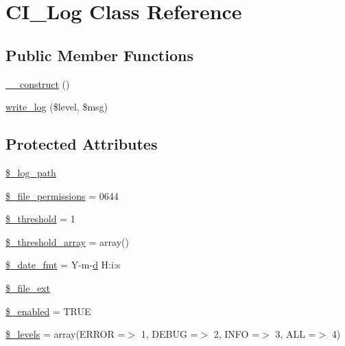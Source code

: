 \hypertarget{class_c_i___log}{}\section{C\+I\+\_\+\+Log Class Reference}
\label{class_c_i___log}
\subsection*{Public Member Functions}
\begin{DoxyCompactItemize}
\item 
\hyperlink{class_c_i___log_a095c5d389db211932136b53f25f39685}{\+\_\+\+\_\+construct} ()
\item 
\hyperlink{class_c_i___log_ae63dcdf6d5a7f494d7e401e3fc6da2b4}{write\+\_\+log} (\$level, \$msg)
\end{DoxyCompactItemize}
\subsection*{Protected Attributes}
\begin{DoxyCompactItemize}
\item 
\hyperlink{class_c_i___log_a3eaf9e92941ee6be33bc972ab76b4caf}{\$\+\_\+log\+\_\+path}
\item 
\hyperlink{class_c_i___log_a8a805f532669024e8868a5cca0d6f97b}{\$\+\_\+file\+\_\+permissions} = 0644
\item 
\hyperlink{class_c_i___log_a0fc9914bdaf300fa9a1745201204e73f}{\$\+\_\+threshold} = 1
\item 
\hyperlink{class_c_i___log_a95562d965f341c55d2c997ed12b4b721}{\$\+\_\+threshold\+\_\+array} = array()
\item 
\hyperlink{class_c_i___log_aab5c1870169c8e04ede18245f04ad85c}{\$\+\_\+date\+\_\+fmt} = \textquotesingle{}Y-\/m-\/\hyperlink{assets_2js_2bootstrap_8min_8js_aeb337d295abaddb5ec3cb34cc2e2bbc9}{d} H\+:i\+:s\textquotesingle{}
\item 
\hyperlink{class_c_i___log_ad0c7fa3db6c5e41616bbdf4719492518}{\$\+\_\+file\+\_\+ext}
\item 
\hyperlink{class_c_i___log_af8233d47e8ad3e624ba168154d2f383d}{\$\+\_\+enabled} = T\+R\+U\+E
\item 
\hyperlink{class_c_i___log_aeb1c4747136537731b6cfed6f1e64941}{\$\+\_\+levels} = array(\textquotesingle{}E\+R\+R\+O\+R\textquotesingle{} =$>$ 1, \textquotesingle{}D\+E\+B\+U\+G\textquotesingle{} =$>$ 2, \textquotesingle{}I\+N\+F\+O\textquotesingle{} =$>$ 3, \textquotesingle{}A\+L\+L\textquotesingle{} =$>$ 4)
\end{DoxyCompactItemize}


